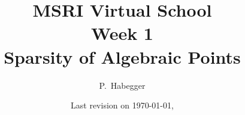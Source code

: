 \documentclass{scrbook}
\begin{document}
\title{MSRI Virtual School \\ Week 1 \\ Sparsity of Algebraic Points}
\author{P.~Habegger}
\date{Last revision on \today, \currenttime}
\maketitle
\setcounter{chapter}{-1}














\end{document}
